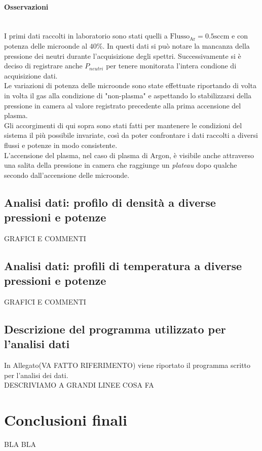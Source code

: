 \paragraph{Osservazioni} ~\\
I primi dati raccolti in laboratorio sono stati quelli a $\text{Flusso}_\text{Ar}=0.5\text{sccm}$ e con potenza delle microonde al $40\%$. In questi dati si può notare la mancanza della pressione dei neutri durante l'acquisizione degli spettri. Successivamente si è deciso di registrare anche $P_{neutri}$ per tenere monitorata l'intera condione di acquisizione dati.\\
Le variazioni di potenza delle microonde sono state effettuate riportando di volta in volta il gas alla condizione di "non-plasma" e aspettando lo stabilizzarsi della pressione in camera al valore registrato precedente alla prima accensione del plasma.\\
Gli accorgimenti di qui sopra sono stati fatti per mantenere le condizioni del sistema il più possibile invariate, così da poter confrontare i dati raccolti a diversi flussi e potenze in modo consistente.\\
L'accensione del plasma, nel caso di plasma di Argon, è visibile anche attraverso una salita della pressione in camera che raggiunge un \textit{plateau} dopo qualche secondo dall'accensione delle microonde.

\subsection{Analisi dati: profilo di densità a diverse pressioni e potenze}

GRAFICI E COMMENTI
\subsection{Analisi dati: profili di temperatura a diverse pressioni e potenze}

GRAFICI E COMMENTI

\subsection{Descrizione del programma utilizzato per l'analisi dati}
In Allegato(VA FATTO RIFERIMENTO) viene riportato il programma scritto per l'analisi dei dati.\\
DESCRIVIAMO A GRANDI LINEE COSA FA



\section{Conclusioni finali}
BLA BLA

